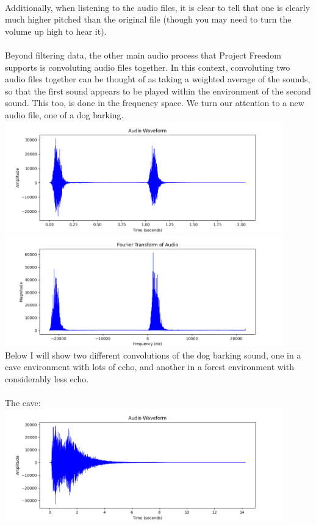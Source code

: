 \documentclass[notitlepage]{article}
\begin{document}
\\
Additionally, when listening to the audio files, it is clear to tell that one is clearly
much higher pitched than the original file (though you may need to turn the volume up high to
hear it).
\\\\
Beyond filtering data, the other main audio process that Project Freedom supports is
convoluting audio files together. In this context, convoluting two audio files together
can be thought of as taking a weighted average of the sounds, so that the first sound appears
to be played within the environment of the second sound. This too, is done in the frequency space. We turn our
attention to a new audio file, one of a dog barking.
\\
\includegraphics[width=4.75in]{../samples/audio/dog_bark_dry_waveform.png}
\\
\includegraphics[width=4.75in]{../samples/audio/dog_bark_dry_fourier_transform.png}
\\
Below I will show two different convolutions of the dog barking sound, one in a cave
environment with lots of echo, and another in a forest environment with considerably
less echo.
\\\\
The cave:
\\
\includegraphics[width=4.75in]{../samples/audio/dog_bark_dry_convolve_cave_waveform.png}
\end{document}
